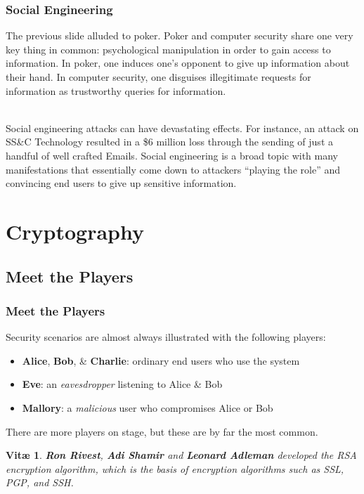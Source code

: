 \documentclass[aspectratio=169]{beamer}
\newtheorem{vita}{Vit\ae}
\begin{document}
\begin{frame}
\frametitle{Social Engineering}
The previous slide alluded to poker. Poker and computer security share one very key thing in common: psychological manipulation in order to gain access to information. In poker, one induces one's opponent to give up information about their hand. In computer security, one disguises illegitimate requests for information as trustworthy queries for information.

\mbox{}\\
Social engineering attacks can have devastating effects. For instance, an attack on SS\&C Technology resulted in a \$6 million loss through the sending of just a handful of well crafted Emails. \cite{trendmicro} Social engineering is a broad topic with many manifestations that essentially come down to attackers ``playing the role'' and convincing end users to give up sensitive information.
\end{frame}

\section{Cryptography}
\subsection{Meet the Players}
\begin{frame}
\frametitle{Meet the Players}
Security scenarios are almost always illustrated with the following players:
\begin{itemize}
	\item \textbf{Alice}, \textbf{Bob}, \& \textbf{Charlie}: ordinary end users who use the system
	\item \textbf{Eve}: an \emph{eavesdropper} listening to Alice \& Bob
	\item \textbf{Mallory}: a \emph{malicious} user who compromises Alice or Bob
\end{itemize}

There are more players on stage, but these are by far the most common.
\pause
\begin{vita}
\textbf{Ron Rivest}, \textbf{Adi Shamir} and \textbf{Leonard Adleman} developed the RSA encryption algorithm, which is the basis of encryption algorithms such as SSL, PGP, and SSH.
\end{vita}
\end{frame}
\end{document}
